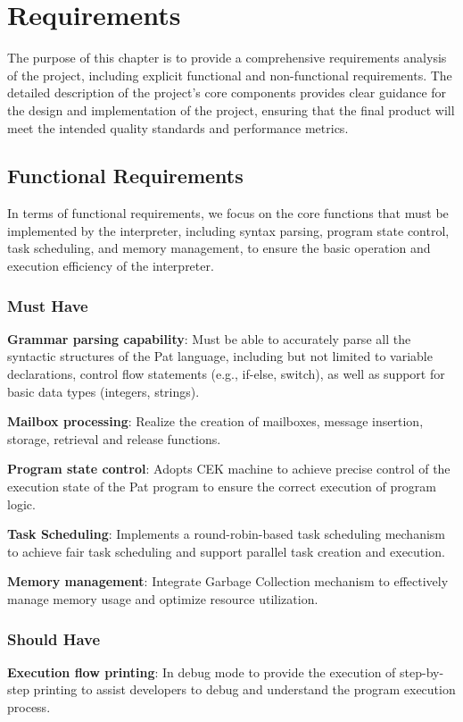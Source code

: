 \documentclass{l4proj}
\begin{document}
\chapter{Requirements}

The purpose of this chapter is to provide a comprehensive requirements analysis of the project, including explicit functional and non-functional requirements. The detailed description of the project's core components provides clear guidance for the design and implementation of the project, ensuring that the final product will meet the intended quality standards and performance metrics.

\section{Functional Requirements}
In terms of functional requirements, we focus on the core functions that must be implemented by the interpreter, including syntax parsing, program state control, task scheduling, and memory management, to ensure the basic operation and execution efficiency of the interpreter.

\subsection{Must Have}
\textbf{Grammar parsing capability}: Must be able to accurately parse all the syntactic structures of the Pat language, including but not limited to variable declarations, control flow statements (e.g., if-else, switch), as well as support for basic data types (integers, strings).

\textbf{Mailbox processing}: Realize the creation of mailboxes, message insertion, storage, retrieval and release functions.

\textbf{Program state control}: Adopts CEK machine to achieve precise control of the execution state of the Pat program to ensure the correct execution of program logic.

\textbf{Task Scheduling}: Implements a round-robin-based task scheduling mechanism to achieve fair task scheduling and support parallel task creation and execution.

\textbf{Memory management}: Integrate Garbage Collection mechanism to effectively manage memory usage and optimize resource utilization.

\subsection{Should Have}
\textbf{Execution flow printing}: In debug mode to provide the execution of step-by-step printing to assist developers to debug and understand the program execution process.
\end{document}
